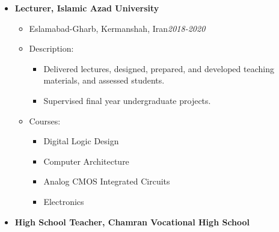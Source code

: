 \begin {itemize}
\begin {itemize}
\begin {itemize}
\begin {itemize}
 and eventually debugging it.
                    \end {itemize}
                    \item [-]   {   Courses:} 
                    \begin {itemize}   
                        \item [\textbullet]  Digital Logic Design II
                        \item [\textbullet] Embedded Systems
                        \item [\textbullet] Electronics I
                    \end {itemize}
            \end {itemize} \vspace{0.3cm}         
     \item [$\bullet$] \bf {\mtf \normalsize   Lecturer, Islamic Azad University} \mdseries
            \begin {itemize}
                \item [-]  {  Eslamabad-Gharb, Kermanshah, Iran\small \hspace{5cm}\textit{2018-2020}\normalsize} 
                \item [-]   {  Description:} 
                    \begin {itemize}
                        \item [\textbullet]  Delivered lectures, designed, prepared, and developed teaching materials, and assessed students.
                        \item [\textbullet]  Supervised  final year undergraduate projects.
                    \end {itemize}
                    \item [-]   {   Courses:} 
                    \begin {itemize}   
                        \item [\textbullet] Digital Logic Design
                        \item [\textbullet]  Computer Architecture
                        \item [\textbullet] Analog CMOS Integrated Circuits
                         \item [\textbullet] Electronics
                    \end {itemize}    
            \end {itemize} \vspace{0.3cm}   
     \item [$\bullet$] \bf {\mtf \normalsize   High School Teacher, Chamran Vocational High School} \mdseries

\end{itemize}
\end{itemize}
